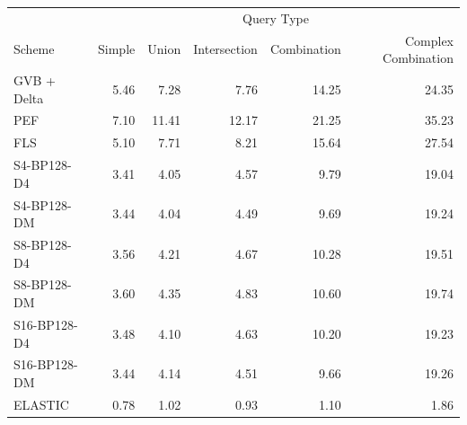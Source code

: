 \begin{tabular}{lrrrrr}
\toprule
 & \multicolumn{5}{c}{Query Type} \\
Scheme & Simple & Union & Intersection & Combination & Complex Combination \\
\midrule
GVB + Delta & 5.46 & 7.28 & 7.76 & 14.25 & 24.35 \\
PEF & 7.10 & 11.41 & 12.17 & 21.25 & 35.23 \\
FLS & 5.10 & 7.71 & 8.21 & 15.64 & 27.54 \\
S4-BP128-D4 & 3.41 & 4.05 & 4.57 & 9.79 & 19.04 \\
S4-BP128-DM & 3.44 & 4.04 & 4.49 & 9.69 & 19.24 \\
S8-BP128-D4 & 3.56 & 4.21 & 4.67 & 10.28 & 19.51 \\
S8-BP128-DM & 3.60 & 4.35 & 4.83 & 10.60 & 19.74 \\
S16-BP128-D4 & 3.48 & 4.10 & 4.63 & 10.20 & 19.23 \\
S16-BP128-DM & 3.44 & 4.14 & 4.51 & 9.66 & 19.26 \\
ELASTIC & 0.78 & 1.02 & 0.93 & 1.10 & 1.86 \\
\bottomrule
\end{tabular}
